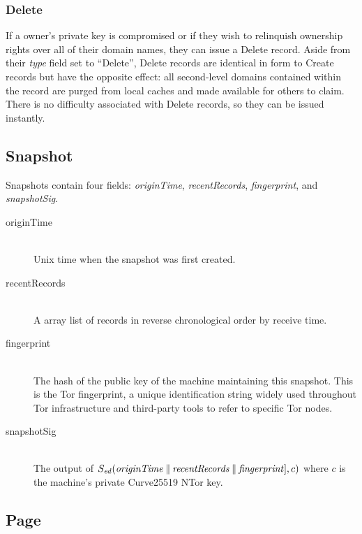 \subsubsection{Delete}


If a owner's private key is compromised or if they wish to relinquish ownership rights over all of their domain names, they can issue a Delete record. Aside from their \emph{type} field set to ``Delete'', Delete records are identical in form to Create records but have the opposite effect: all second-level domains contained within the record are purged from local caches and made available for others to claim. There is no difficulty associated with Delete records, so they can be issued instantly.

\subsection{Snapshot}

Snapshots contain four fields: \emph{originTime}, \emph{recentRecords}, \emph{fingerprint}, and \emph{snapshotSig}.

\begin{description}
	\item[originTime] \hfill \\
		Unix time when the snapshot was first created.
	\item[recentRecords] \hfill \\
		A array list of records in reverse chronological order by receive time.
	\item[fingerprint] \hfill \\
		The hash of the public key of the machine maintaining this snapshot. This is the Tor fingerprint, a unique identification string widely used throughout Tor infrastructure and third-party tools to refer to specific Tor nodes.
	\item[snapshotSig] \hfill \\
		The output of $ S_{\mathit{ed}}(\mathit{originTime} \mathbin{\|} \mathit{recentRecords} \mathbin{\|} \mathit{fingerprint}], c) $ where $ c $ is the machine's private Curve25519 NTor key.
\end{description}
		
\subsection{Page}

